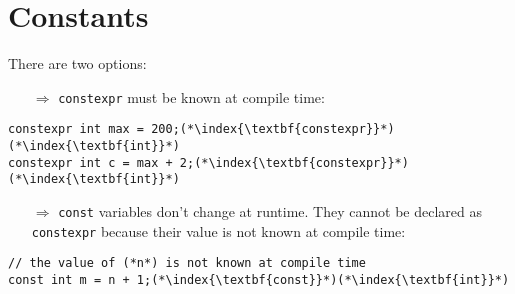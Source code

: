 \documentclass[10pt]{article}
\begin{document}
\section{Constants}
\small
There are two options:
\begin{enumerate}
\item[$\Rightarrow$] \texttt{constexpr} must be known at compile time:
\end{enumerate}
\begin{lstlisting}
constexpr int max = 200;(*\index{\textbf{constexpr}}*)(*\index{\textbf{int}}*)
constexpr int c = max + 2;(*\index{\textbf{constexpr}}*)(*\index{\textbf{int}}*)
\end{lstlisting}
\begin{enumerate}
\item[$\Rightarrow$] \texttt{const} variables don't change at runtime. They cannot be declared as
\texttt{constexpr} because their value is not known at compile time:
\end{enumerate}
\begin{lstlisting}
// the value of (*n*) is not known at compile time
const int m = n + 1;(*\index{\textbf{const}}*)(*\index{\textbf{int}}*)
\end{lstlisting}
%
%
\end{document}
